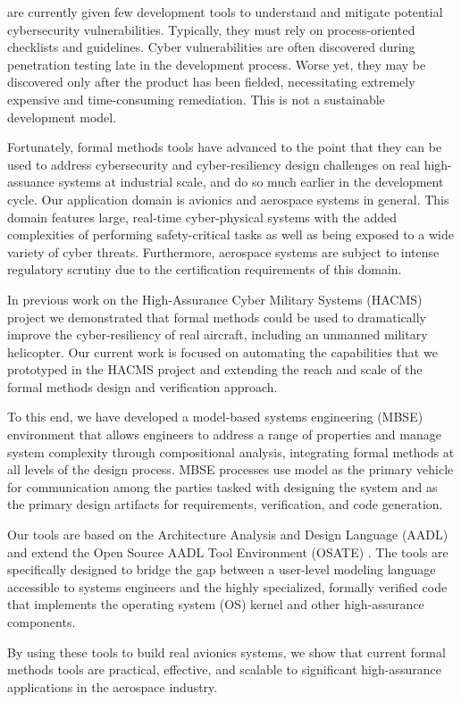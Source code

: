  are currently given few
development tools to understand and mitigate 
potential cybersecurity vulnerabilities.  Typically, they must rely on
process-oriented checklists and guidelines. Cyber vulnerabilities
are often discovered during penetration testing late in the
development process. Worse yet, they may be discovered
only after the product has been fielded, necessitating extremely
expensive and time-consuming remediation. This is not a
sustainable development model.

Fortunately, formal methods tools have advanced to the point that they can 
be used to address cybersecurity and cyber-resiliency design challenges
on real high-assuance systems at industrial scale, and do so much earlier in
the development cycle.  Our application domain is avionics and aerospace systems in general.  
This domain features large, real-time cyber-physical systems with the added 
complexities of performing safety-critical tasks as well as being exposed to 
a wide variety of cyber threats.  Furthermore, aerospace systems are subject 
to intense regulatory scrutiny due to the certification requirements of this domain. 

In previous work on the High-Assurance Cyber Military Systems (HACMS) project \cite{HACMS}
we demonstrated that formal methods could be used to dramatically improve the 
cyber-resiliency of real aircraft, including an unmanned military helicopter.  Our current
work is focused on automating the capabilities that we prototyped in the HACMS project
and extending the reach and scale of the formal methods design and verification approach.  

To this end, we have developed a model-based systems engineering (MBSE) 
environment that allows engineers to address a range of properties and 
manage system complexity through compositional analysis, integrating formal methods
at all levels of the design process.  MBSE processes use model as the primary vehicle for 
communication among the parties tasked with designing the system and as the primary 
design artifacts for requirements, verification, and code generation.  

Our tools are based on the 
Architecture Analysis and Design Language (AADL) and extend the Open Source
AADL Tool Environment (OSATE) \cite{OSATE}.  The tools are specifically designed 
to bridge the gap between a user-level modeling language accessible to systems 
engineers and the highly specialized, formally verified code that implements the operating system (OS)
kernel and other high-assurance components.   

By using these tools to build real avionics systems, we show 
that current formal methods tools are practical, effective, and scalable to significant 
high-assurance applications in the aerospace industry.  
